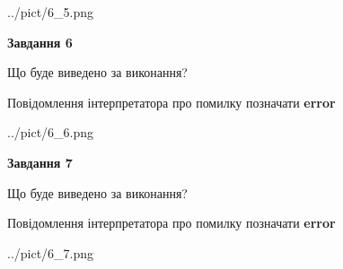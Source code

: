 \documentclass[10pt, ukrainian]{article}
\begin{document}
{\begin {large}
\begin{center}
	{../pict/6_5.png}
\end{center}
\newpage

{\begin {center}\textbf{Завдання 6}\end {center}}\par
Що буде виведено за виконання? \par
Повідомлення інтерпретатора про помилку позначати \textbf{error}

\begin{center}
	{../pict/6_6.png}
\end{center}
\newpage

{\begin {center}\textbf{Завдання 7}\end {center}}\par
Що буде виведено за виконання? \par
Повідомлення інтерпретатора про помилку позначати \textbf{error}

\begin{center}
	{../pict/6_7.png}
\end{center}
\newpage

\end {large}}
\end{document}
